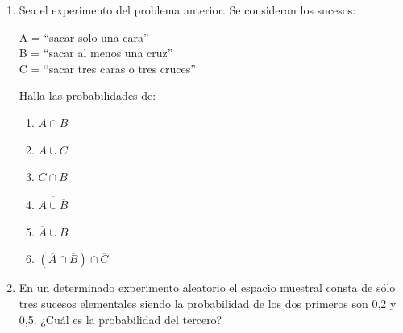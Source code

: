 \documentclass[10pt,twoside]{article}
\begin{document}
\begin{enumerate}
\item Sea el experimento del problema anterior. Se  consideran los sucesos:
\begin{multicols}{2}
  A = “sacar solo una cara”\\
  B = “sacar al menos una cruz”\\
  C = “sacar tres caras o tres cruces”\\
\end{multicols}
Halla las probabilidades de:
\begin{multicols}{3}
  \begin{enumerate}
    \item $ A\cap B $
    \item $ A\cup C $
    \item $ C\cap \overline{B} $
    \item $ \overline{A\cup \overline{B}} $
    \item $ \overline{A}\cup B $
    \item $ (\overline{A}\cap\overline{B})\cap \overline{C} $
  \end{enumerate}
\end{multicols}
\item En un determinado experimento aleatorio el espacio muestral consta de sólo tres sucesos elementales siendo la probabilidad de los dos primeros son 0,2 y 0,5. ¿Cuál es la
probabilidad del tercero?
\end{enumerate}
\end{document}
